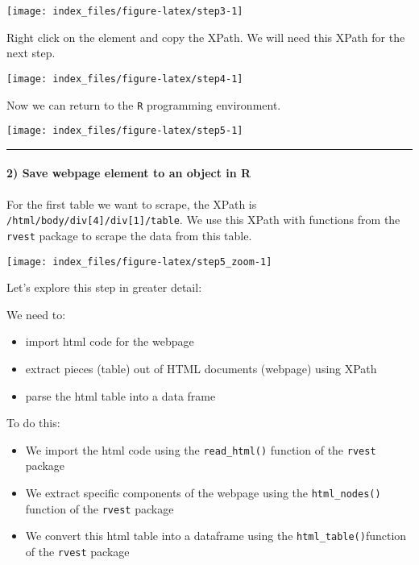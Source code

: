 \documentclass[
]{article}
\providecommand{\tightlist}{%
  \setlength{\itemsep}{0pt}\setlength{\parskip}{0pt}}
\begin{document}
\begin{center}\texttt{[image: index\_files/figure-latex/step3-1]} \end{center}

Right click on the element and copy the XPath. We will need this XPath
for the next step.

\begin{center}\texttt{[image: index\_files/figure-latex/step4-1]} \end{center}

Now we can return to the \texttt{R} programming environment.

\begin{center}\texttt{[image: index\_files/figure-latex/step5-1]} \end{center}

\begin{center}\rule{0.5\linewidth}{0.5pt}\end{center}

\hypertarget{save-webpage-element-to-an-object-in-r}{%
\paragraph{2) Save webpage element to an object in
R}\label{save-webpage-element-to-an-object-in-r}}

For the first table we want to scrape, the XPath is
\texttt{/html/body/div{[}4{]}/div{[}1{]}/table}. We use this XPath with
functions from the \texttt{rvest} package to scrape the data from this
table.

\begin{center}\texttt{[image: index\_files/figure-latex/step5\_zoom-1]} \end{center}

Let's explore this step in greater detail:

We need to:

\begin{itemize}
\tightlist
\item
  import html code for the webpage
\item
  extract pieces (table) out of HTML documents (webpage) using XPath
\item
  parse the html table into a data frame
\end{itemize}

To do this:

\begin{itemize}
\tightlist
\item
  We import the html code using the \texttt{read\_html()} function of
  the \texttt{rvest} package
\item
  We extract specific components of the webpage using the
  \texttt{html\_nodes()} function of the \texttt{rvest} package
\item
  We convert this html table into a dataframe using the
  \texttt{html\_table()}function of the \texttt{rvest} package
\end{itemize}
\end{document}
